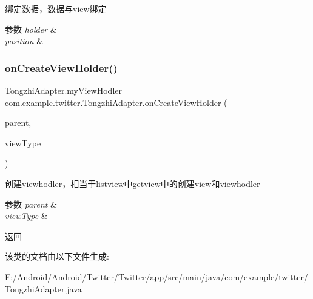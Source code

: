 绑定数据，数据与view绑定


\begin{DoxyParams}{参数}
{\em holder} & \\
\hline
{\em position} & \\
\hline
\end{DoxyParams}
\mbox{\label{classcom_1_1example_1_1twitter_1_1_tongzhi_adapter_a27f962280b61a7b2e67ab90a441fbdfe}} 
\subsubsection{\texorpdfstring{on\+Create\+View\+Holder()}{onCreateViewHolder()}}
{\footnotesize\ttfamily Tongzhi\+Adapter.\+my\+View\+Hodler com.\+example.\+twitter.\+Tongzhi\+Adapter.\+on\+Create\+View\+Holder (\begin{DoxyParamCaption}\item[{View\+Group}]{parent,  }\item[{int}]{view\+Type }\end{DoxyParamCaption})\hspace{0.3cm}{\ttfamily [inline]}}

创建viewhodler，相当于listview中getview中的创建view和viewhodler


\begin{DoxyParams}{参数}
{\em parent} & \\
\hline
{\em view\+Type} & \\
\hline
\end{DoxyParams}
\begin{DoxyReturn}{返回}

\end{DoxyReturn}


该类的文档由以下文件生成\+:\begin{DoxyCompactItemize}
\item 
F\+:/\+Android/\+Android/\+Twitter/\+Twitter/app/src/main/java/com/example/twitter/Tongzhi\+Adapter.\+java\end{DoxyCompactItemize}
